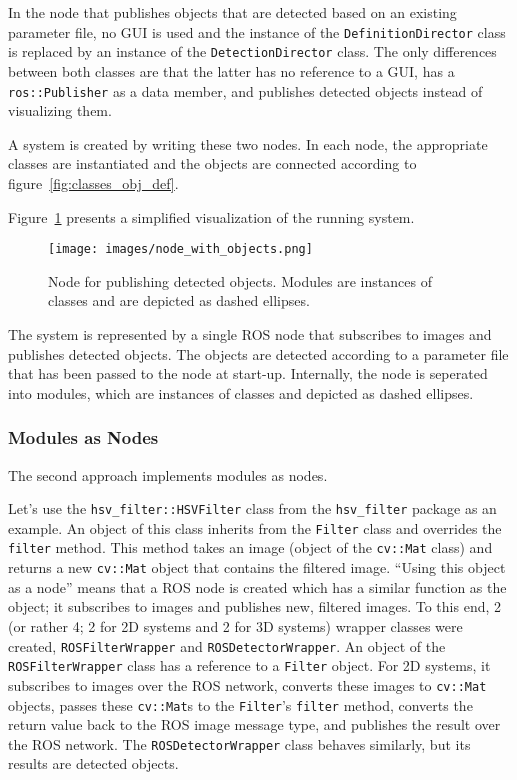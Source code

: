 \documentclass{article}
\newcommand{\code}[1]{\texttt{#1}}
\begin{document}
In the node that publishes objects that are detected based on an existing parameter file,
no GUI is used and the instance of the \code{DefinitionDirector} class is replaced by an instance of
the \code{DetectionDirector} class.
The only differences between both classes are that the latter has no reference to a GUI,
has a \code{ros::Publisher} as a data member,
and publishes detected objects instead of visualizing them.


A system is created by writing these two nodes.
In each node, the appropriate classes are instantiated and the
objects are connected according to figure~\ref{fig:classes_obj_def}.



Figure~\ref{fig:node_with_objects} presents a simplified visualization
of the running system.
\begin{figure}
	\centering
	\texttt{[image: images/node\_with\_objects.png]}
	\caption{Node for publishing detected objects. Modules are instances of
	classes and are depicted as dashed ellipses.}
	\label{fig:node_with_objects}
\end{figure}
The system is represented by a single ROS node that subscribes to images
and publishes detected objects.
The objects are detected according to a parameter file that has been passed
to the node at start-up.
Internally, the node is seperated into modules, which are instances of classes
and depicted as dashed ellipses.


\subsubsection{Modules as Nodes}
\label{sec:modules_as_nodes}
The second approach implements modules as nodes.

Let's use the \code{hsv\_filter::HSVFilter} class from the \code{hsv\_filter} package
as an example.
An object of this class inherits from the \code{Filter} class
and overrides the \code{filter} method.
This method takes an image (object of the \code{cv::Mat} class) and
returns a new \code{cv::Mat} object that contains the filtered
image.
``Using this object as a node'' means that a ROS node is created which
has a similar function as the object;
it subscribes to images and publishes new, filtered images.
To this end, 2 (or rather 4; 2 for 2D systems and 2 for 3D systems)
wrapper classes were created, \code{ROSFilterWrapper} and
\code{ROSDetectorWrapper}.
An object of the \code{ROSFilterWrapper} class
has a reference to a \code{Filter} object.
For 2D systems, it subscribes to images over the ROS network,
converts these images to \code{cv::Mat} objects, passes these \code{cv::Mat}s
to the \code{Filter}'s \code{filter} method, converts the return value back
to the ROS image message type, and publishes the result over the ROS network.
The \code{ROSDetectorWrapper} class behaves similarly, but its results are
detected objects.
\end{document}
